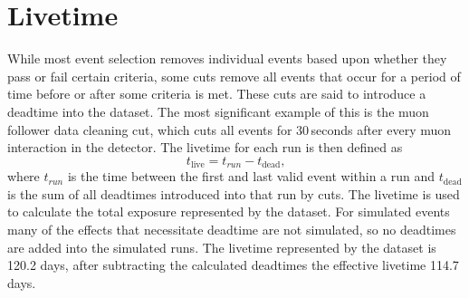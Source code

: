 \section{Livetime}
While most event selection removes individual events based upon whether they
pass or fail certain criteria, some cuts remove all events that occur for a
period of time before or after some criteria is met.
These cuts are said to introduce a deadtime into the dataset.
The most significant example of this is the muon follower data cleaning cut, which
cuts all events for 30\,seconds after every muon interaction in the detector.
The livetime for each run is then defined as
\begin{equation}
    t_{\mathrm{live}} = t_{run} - t_{\mathrm{dead}}\text{,}
\end{equation}
where $t_{run}$ is the time between the first and last valid event within a run
and $t_{\mathrm{dead}}$ is the sum of all deadtimes introduced into that run by cuts.
The livetime is used to calculate the total exposure represented by the dataset.
For simulated events many of the effects that necessitate deadtime are not simulated,
so no deadtimes are added into the simulated runs.
The livetime represented by the dataset is 120.2 days, after subtracting the
calculated deadtimes the effective livetime  114.7 days.
